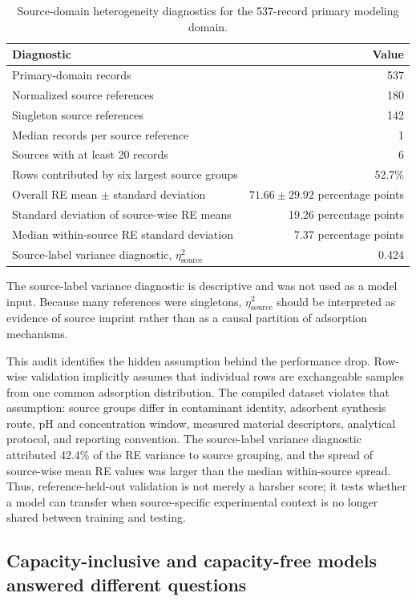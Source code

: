 \documentclass[review,12pt,number]{elsarticle}
\begin{document}
\begin{table}[htbp]
\centering
\caption{Source-domain heterogeneity diagnostics for the 537-record primary modeling domain.}
\label{tab:source_diag}
\small
\begin{tabular}{lr}
\toprule
Diagnostic & Value \\
\midrule
Primary-domain records & 537 \\
Normalized source references & 180 \\
Singleton source references & 142 \\
Median records per source reference & 1 \\
Sources with at least 20 records & 6 \\
Rows contributed by six largest source groups & 52.7\% \\
Overall RE mean $\pm$ standard deviation & $71.66 \pm 29.92$ percentage points \\
Standard deviation of source-wise RE means & 19.26 percentage points \\
Median within-source RE standard deviation & 7.37 percentage points \\
Source-label variance diagnostic, $\eta^2_{\mathrm{source}}$ & 0.424 \\
\bottomrule
\end{tabular}
\parbox{0.95\linewidth}{\footnotesize The source-label variance diagnostic is descriptive and was not used as a model input. Because many references were singletons, $\eta^2_{\mathrm{source}}$ should be interpreted as evidence of source imprint rather than as a causal partition of adsorption mechanisms.}
\end{table}

This audit identifies the hidden assumption behind the performance drop. Row-wise validation implicitly assumes that individual rows are exchangeable samples from one common adsorption distribution. The compiled dataset violates that assumption: source groups differ in contaminant identity, adsorbent synthesis route, pH and concentration window, measured material descriptors, analytical protocol, and reporting convention. The source-label variance diagnostic attributed 42.4\% of the RE variance to source grouping, and the spread of source-wise mean RE values was larger than the median within-source spread. Thus, reference-held-out validation is not merely a harsher score; it tests whether a model can transfer when source-specific experimental context is no longer shared between training and testing.

\subsection{Capacity-inclusive and capacity-free models answered different questions}
\end{document}
